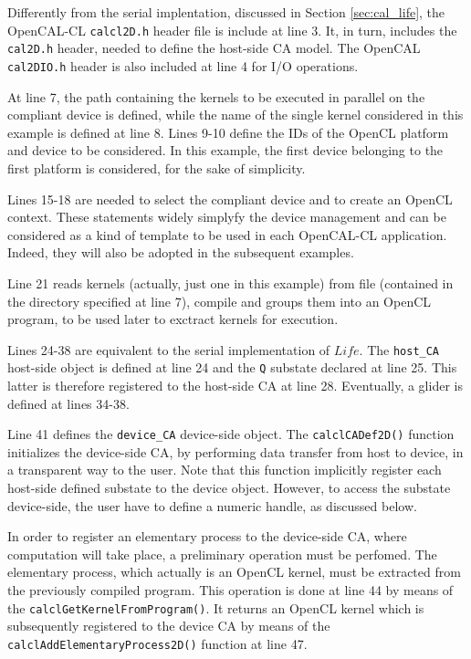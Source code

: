 

Differently from the serial implentation, discussed in Section
\ref{sec:cal_life}, the OpenCAL-CL \verb'calcl2D.h' header file is
include at line 3. It, in turn, includes the \verb'cal2D.h' header,
needed to define the host-side CA model. The OpenCAL \verb'cal2DIO.h'
header is also included at line 4 for I/O operations.

At line 7, the path containing the kernels to be executed in parallel
on the compliant device is defined, while the name of the single
kernel considered in this example is defined at line 8. Lines 9-10
define the IDs of the OpenCL platform and device to be considered. In
this example, the first device belonging to the first platform is
considered, for the sake of simplicity.

Lines 15-18 are needed to select the compliant device and to create an
OpenCL context. These statements widely simplyfy the device management
and can be considered as a kind of template to be used in each
OpenCAL-CL application. Indeed, they will also be adopted in the
subsequent examples.

Line 21 reads kernels (actually, just one in this example) from file
(contained in the directory specified at line 7), compile and groups
them into an OpenCL program, to be used later to exctract kernels for
execution.

Lines 24-38 are equivalent to the serial implementation of $Life$. The
\verb'host_CA' host-side object is defined at line 24 and the \verb'Q'
substate declared at line 25. This latter is therefore registered to
the host-side CA at line 28. Eventually, a glider is defined at lines
34-38.

Line 41 defines the \verb'device_CA' device-side object. The
\verb'calclCADef2D()' function initializes the device-side CA, by
performing data transfer from host to device, in a transparent way to
the user. Note that this function implicitly register each host-side
defined substate to the device object. However, to access the substate
device-side, the user have to define a numeric handle, as discussed
below.

In order to register an elementary process to the device-side CA,
where computation will take place, a preliminary operation must be
perfomed. The elementary process, which actually is an OpenCL kernel,
must be extracted from the previously compiled program. This operation
is done at line 44 by means of the
\verb'calclGetKernelFromProgram()'. It returns an OpenCL kernel which
is subsequently registered to the device CA by means of the
\verb'calclAddElementaryProcess2D()' function at line 47.

